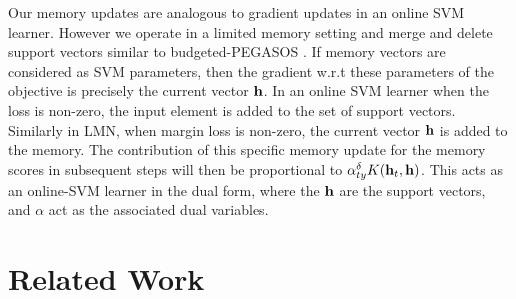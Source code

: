 \documentclass[letterpaper]{article} %
\newcommand{\vek}[1]{{\bf {#1}}}
\newcommand{\vh}{{\vek{h}}}
\def\sunita#1{\todo [color=purple]{Sunita: #1}}
\begin{document}
Our memory updates are analogous to gradient updates in an online SVM learner. However we operate in a limited memory setting and merge and delete support vectors similar to budgeted-PEGASOS \cite{WangCV10}. If memory vectors are considered as SVM parameters, then the gradient w.r.t these parameters of the objective is precisely the current vector $\bf{h}$. In an online SVM learner when the loss is non-zero, the input element is added to the set of support vectors. Similarly in LMN, when margin loss is non-zero, the current vector $\bf{h}$ is added to the memory. The contribution of this specific memory update for the memory scores in subsequent steps will then be proportional to $\alpha_{ty}^\delta K(\vh_t, \bf{h})$. This acts as an online-SVM learner in the dual form, where the $\bf{h}$ are the support vectors, and $\alpha$ act as the associated dual variables.





\section{Related Work}
\end{document}
